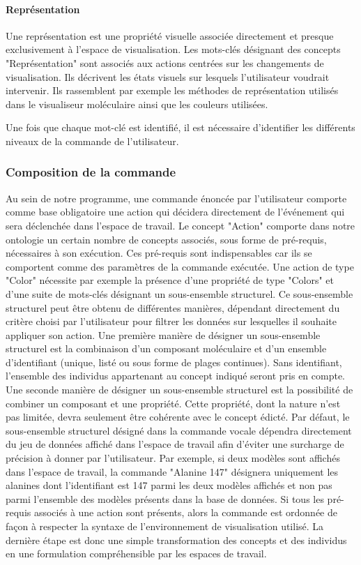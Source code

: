 \paragraph{Représentation}

Une représentation est une propriété visuelle associée directement et presque exclusivement à l'espace de visualisation. Les mots-clés désignant des concepts "Représentation" sont associés aux actions centrées sur les changements de visualisation. Ils décrivent les états visuels sur lesquels l'utilisateur voudrait intervenir. Ils rassemblent par exemple les méthodes de représentation utilisés dans le visualiseur moléculaire ainsi que les couleurs utilisées.

Une fois que chaque mot-clé est identifié, il est nécessaire d'identifier les différents niveaux de la commande de l'utilisateur.

\subsubsection{Composition de la commande}

Au sein de notre programme, une commande énoncée par l'utilisateur comporte comme base obligatoire une action qui décidera directement de l'événement qui sera déclenchée dans l'espace de travail. Le concept "Action" comporte dans notre ontologie un certain nombre de concepts associés, sous forme de pré-requis, nécessaires à son exécution. Ces pré-requis sont indispensables car ils se comportent comme des paramètres de la commande exécutée. Une action de type "Color" nécessite par exemple la présence d'une propriété de type "Colors" et d'une suite de mots-clés désignant un sous-ensemble structurel. Ce sous-ensemble structurel peut être obtenu de différentes manières, dépendant directement du critère choisi par l'utilisateur pour filtrer les données sur lesquelles il souhaite appliquer son action. Une première manière de désigner un sous-ensemble structurel est la combinaison d'un composant moléculaire et d'un ensemble d'identifiant (unique, listé ou sous forme de plages continues). Sans identifiant, l'ensemble des individus appartenant au concept indiqué seront pris en compte. Une seconde manière de désigner un sous-ensemble structurel est la possibilité de combiner un composant et une propriété. Cette propriété, dont la nature n'est pas limitée, devra seulement être cohérente avec le concept édicté.
Par défaut, le sous-ensemble structurel désigné dans la commande vocale dépendra directement du jeu de données affiché dans l'espace de travail afin d'éviter une surcharge de précision à donner par l'utilisateur. Par exemple, si deux modèles sont affichés dans l'espace de travail, la commande "Alanine 147" désignera uniquement les alanines dont l'identifiant est 147 parmi les deux modèles affichés et non pas parmi l'ensemble des modèles présents dans la base de données.
Si tous les pré-requis associés à une action sont présents, alors la commande est ordonnée de façon à respecter la syntaxe de l'environnement de visualisation utilisé. La dernière étape est donc une simple transformation des concepts et des individus en une formulation compréhensible par les espaces de travail.

